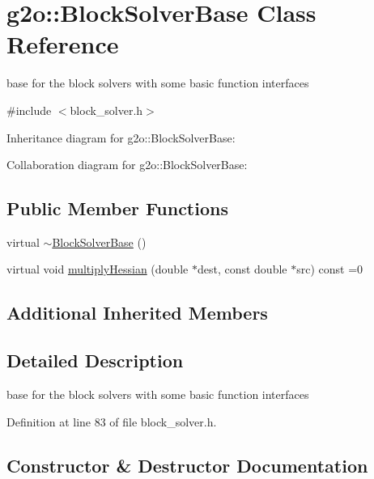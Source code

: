 \hypertarget{classg2o_1_1BlockSolverBase}{}\section{g2o\+:\+:Block\+Solver\+Base Class Reference}
\label{classg2o_1_1BlockSolverBase}


base for the block solvers with some basic function interfaces  




{\ttfamily \#include $<$block\+\_\+solver.\+h$>$}



Inheritance diagram for g2o\+:\+:Block\+Solver\+Base\+:


Collaboration diagram for g2o\+:\+:Block\+Solver\+Base\+:
\subsection*{Public Member Functions}
\begin{DoxyCompactItemize}
\item 
virtual \hyperlink{classg2o_1_1BlockSolverBase_a59aabc7d24599a7f7b251cc0040bcb0a}{$\sim$\+Block\+Solver\+Base} ()
\item 
virtual void \hyperlink{classg2o_1_1BlockSolverBase_a4ff7072751bfa1b7fcf91f8219e18e13}{multiply\+Hessian} (double $\ast$dest, const double $\ast$src) const =0
\end{DoxyCompactItemize}
\subsection*{Additional Inherited Members}


\subsection{Detailed Description}
base for the block solvers with some basic function interfaces 

Definition at line 83 of file block\+\_\+solver.\+h.



\subsection{Constructor \& Destructor Documentation}
